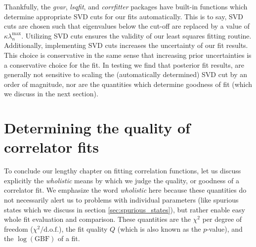 Thankfully, the \textit{gvar}, \textit{lsqfit}, and \textit{corrfitter} packages \cite{gvar_package, peter_lepage_2024_12690493, peter_lepage_2021_5733391} have built-in functions which determine appropriate SVD cuts for our fits automatically.  This is to say, SVD cuts are chosen such that eigenvalues below the cut-off are replaced by a value of $\kappa\lambda_n^\mathrm{max}$.  Utilizing SVD cuts ensures the validity of our least squares fitting routine.  Additionally, implementing SVD cuts increases the uncertainty of our fit results.  This choice is conservative in the same sense that increasing prior uncertainties is a conservative choice for the fit.  In testing we find that posterior fit results, are generally not sensitive to scaling the (automatically determined) SVD cut by an order of magnitude, nor are the quantities which determine goodness of fit (which we discuss in the next section).

\section{Determining the quality of correlator fits}\label{sec:goodness_of_fit}
To conclude our lengthy chapter on fitting correlation functions, let us discuss explicitly the \textit{wholistic} means by which we judge the quality, or goodness of a correlator fit.  We emphasize the word \textit{wholistic} here because these quantities do not necessarily alert us to problems with individual parameters (like spurious states which we discuss in section \ref{sec:spurious_states}), but rather enable easy whole fit evaluation and comparison.  These quantities are the $\chi^2$ per degree of freedom ($\chi^2/\mathrm{d.o.f.}$), the fit quality $Q$ (which is also known as the $p$-value), and the $\log(\mathrm{GBF})$ of a fit.  

